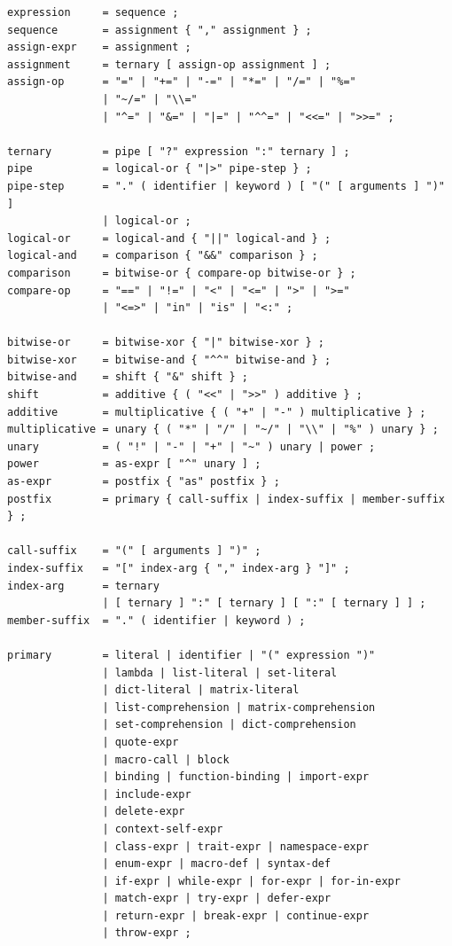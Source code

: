 \documentclass[UTF8,12pt]{ctexart}
\begin{document}
\begin{lstlisting}
expression     = sequence ;
sequence       = assignment { "," assignment } ;
assign-expr    = assignment ;
assignment     = ternary [ assign-op assignment ] ;
assign-op      = "=" | "+=" | "-=" | "*=" | "/=" | "%="
               | "~/=" | "\\="
               | "^=" | "&=" | "|=" | "^^=" | "<<=" | ">>=" ;

ternary        = pipe [ "?" expression ":" ternary ] ;
pipe           = logical-or { "|>" pipe-step } ;
pipe-step      = "." ( identifier | keyword ) [ "(" [ arguments ] ")" ]
               | logical-or ;
logical-or     = logical-and { "||" logical-and } ;
logical-and    = comparison { "&&" comparison } ;
comparison     = bitwise-or { compare-op bitwise-or } ;
compare-op     = "==" | "!=" | "<" | "<=" | ">" | ">="
               | "<=>" | "in" | "is" | "<:" ;

bitwise-or     = bitwise-xor { "|" bitwise-xor } ;
bitwise-xor    = bitwise-and { "^^" bitwise-and } ;
bitwise-and    = shift { "&" shift } ;
shift          = additive { ( "<<" | ">>" ) additive } ;
additive       = multiplicative { ( "+" | "-" ) multiplicative } ;
multiplicative = unary { ( "*" | "/" | "~/" | "\\" | "%" ) unary } ;
unary          = ( "!" | "-" | "+" | "~" ) unary | power ;
power          = as-expr [ "^" unary ] ;
as-expr        = postfix { "as" postfix } ;
postfix        = primary { call-suffix | index-suffix | member-suffix } ;

call-suffix    = "(" [ arguments ] ")" ;
index-suffix   = "[" index-arg { "," index-arg } "]" ;
index-arg      = ternary
               | [ ternary ] ":" [ ternary ] [ ":" [ ternary ] ] ;
member-suffix  = "." ( identifier | keyword ) ;

primary        = literal | identifier | "(" expression ")"
               | lambda | list-literal | set-literal
               | dict-literal | matrix-literal
               | list-comprehension | matrix-comprehension
               | set-comprehension | dict-comprehension
               | quote-expr
               | macro-call | block
               | binding | function-binding | import-expr
               | include-expr
               | delete-expr
               | context-self-expr
               | class-expr | trait-expr | namespace-expr
               | enum-expr | macro-def | syntax-def
               | if-expr | while-expr | for-expr | for-in-expr
               | match-expr | try-expr | defer-expr
               | return-expr | break-expr | continue-expr
               | throw-expr ;
\end{lstlisting}
\end{document}
